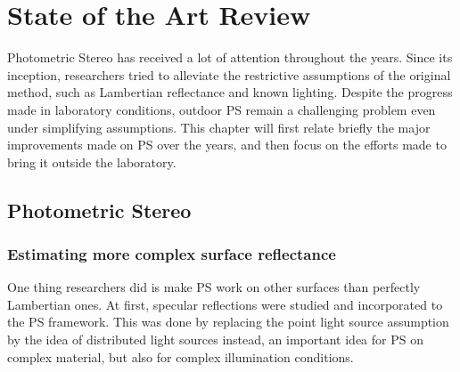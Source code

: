 
\chapter{State of the Art Review}
\label{c:sota}



Photometric Stereo has received a lot of attention throughout the years. Since its inception, researchers tried to alleviate the restrictive assumptions of the original method, such as Lambertian reflectance and known lighting. Despite the progress made in laboratory conditions, outdoor PS remain a challenging problem even under simplifying assumptions. This chapter will first relate briefly the major improvements made on PS over the years, and then focus on the efforts made to bring it outside the laboratory.


\section{Photometric Stereo}


\subsection{Estimating more complex surface reflectance}
One thing researchers did is make PS work on other surfaces than perfectly Lambertian ones. At first, specular reflections \cite{Ikeuchi1981} were studied and incorporated to the PS framework. This was done by replacing the point light source assumption by the idea of distributed light sources instead, an important idea for PS on complex material, but also for complex illumination conditions.

